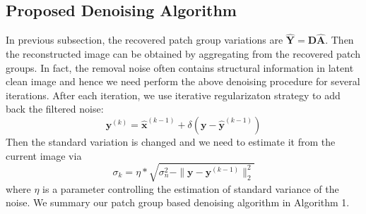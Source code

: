\documentclass[10pt,twocolumn,letterpaper]{article}
\begin{document}
\subsection{Proposed Denoising Algorithm}
In previous subsection, the recovered patch group variations are $\hat{\mathbf{Y}} = \mathbf{D}\hat{\mathbf{A}}$. Then the reconstructed image can be obtained by aggregating from the recovered patch groups. In fact, the removal noise often contains structural information in latent clean image\cite{nlm} and hence we need perform the above denoising procedure for several iterations. After each iteration, we use iterative regularizaton strategy\cite{osher2005iterative} to add back the filtered noise:
\begin{equation}
\mathbf{y}^{(k)}=\hat{\mathbf{x}}^{(k-1)}+\delta(\mathbf{y}-\hat{\mathbf{y}}^{(k-1)})
\end{equation}
Then the standard variation is changed and we need to estimate it from the current image via
\begin{equation}
\sigma_{k} = \eta*\sqrt{\sigma_{n}^{2}-\|\mathbf{y}-\mathbf{y}^{(k-1)}\|_{2}^{2}}
\end{equation}
where $\eta$ is a parameter controlling the estimation of standard variance of the noise. We summary our patch group based denoising algorithm in Algorithm 1.
\end{document}
